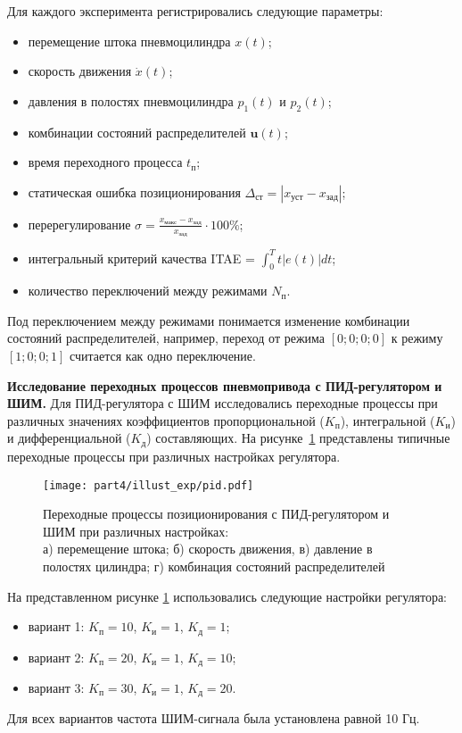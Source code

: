 Для каждого эксперимента регистрировались следующие параметры:
\begin{itemize}
	\item перемещение штока пневмоцилиндра $x(t)$;
	\item скорость движения $\dot{x}(t)$;
	\item давления в полостях пневмоцилиндра $p_1(t)$ и $p_2(t)$;
	\item комбинации состояний распределителей $\mathbf{u}(t)$;
	\item время переходного процесса $t_{\text{п}}$;
	\item статическая ошибка позиционирования $\Delta_{\text{ст}} = |x_{\text{уст}} - x_{\text{зад}}|$;
	\item перерегулирование $\sigma = \frac{x_{\text{макс}} - x_{\text{зад}}}{x_{\text{зад}}} \cdot 100\%$;
	\item интегральный критерий качества ITAE = $\int_{0}^{T} t|e(t)|dt$;
	\item количество переключений между режимами $N_{\text{п}}$.
\end{itemize}

Под переключением между режимами понимается изменение комбинации
состояний распределителей, например, переход от режима $[0;0;0;0]$ к режиму $[1;0;0;1]$ считается как одно переключение.

\textbf{Исследование переходных процессов пневмопривода с ПИД-регулятором и ШИМ.}
Для ПИД-регулятора с ШИМ исследовались переходные процессы при различных значениях
коэффициентов пропорциональной ($K_{\text{п}}$), интегральной ($K_{\text{и}}$) и дифференциальной ($K_{\text{д}}$) составляющих.
На рисунке~\ref{fig:transient_exp_pid} представлены типичные переходные процессы при различных настройках регулятора.

\begin{figure}[h]
	\centering
	\texttt{[image: part4/illust\_exp/pid.pdf]}
	\caption{Переходные процессы позиционирования с ПИД-регулятором и ШИМ при различных настройках:\\
		а) перемещение штока; б) скорость движения, в) давление в полостях цилиндра; г) комбинация состояний распределителей}
	\label{fig:transient_exp_pid}
\end{figure}

На представленном рисунке \ref{fig:transient_exp_pid} использовались следующие настройки регулятора:
\begin{itemize}
	\item вариант 1: $K_{\text{п}} = 10$, $K_{\text{и}} = 1$, $K_{\text{д}} = 1$;
	\item вариант 2: $K_{\text{п}} = 20$, $K_{\text{и}} = 1$, $K_{\text{д}} = 10$;
	\item вариант 3: $K_{\text{п}} = 30$, $K_{\text{и}} = 1$, $K_{\text{д}} = 20$.
\end{itemize}
Для всех вариантов частота ШИМ-сигнала была установлена равной 10 Гц.

